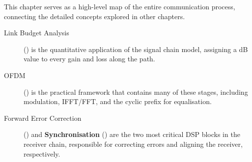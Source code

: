 \begin{importantbox}[title={Further Reading}]
    This chapter serves as a high-level map of the entire communication process, connecting the detailed concepts explored in other chapters.
    \begin{description}
        \item[Link Budget Analysis] () is the quantitative application of the signal chain model, assigning a dB value to every gain and loss along the path.
        \item[OFDM] () is the practical framework that contains many of these stages, including modulation, IFFT/FFT, and the cyclic prefix for equalisation.
        \item[Forward Error Correction] () and \textbf{Synchronisation} () are the two most critical DSP blocks in the receiver chain, responsible for correcting errors and aligning the receiver, respectively.
    \end{description}
\end{importantbox}
